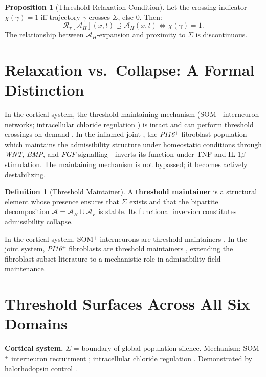 \documentclass[12pt, a4paper, twoside]{book}
\theoremstyle{definition}
\newtheorem{definition}{Definition}[chapter]
\newtheorem{proposition}{Proposition}[chapter]
\theoremstyle{remark}
\newcommand{\Adm}{\mathcal{A}}
\newcommand{\Relax}{\mathcal{R}}
\newcommand{\term}[1]{\textbf{#1}}
\newcommand{\gene}[1]{\textit{#1}}
\begin{document}
\begin{proposition}[Threshold Relaxation Condition]
Let the crossing indicator $\chi(\gamma) = 1$ iff trajectory $\gamma$ crosses $\Sigma$, else $0$. Then:
\begin{equation}
  \Relax_\tau[\Adm_H](x,t) \supsetneq \Adm_H(x,t) \iff \chi(\gamma) = 1.
\end{equation}
The relationship between $\Adm_H$-expansion and proximity to $\Sigma$ is discontinuous.
\end{proposition}

\section{Relaxation vs.\ Collapse: A Formal Distinction}

In the cortical system, the threshold-maintaining mechanism (SOM$^+$ interneuron networks; intracellular chloride regulation \citep{alfonsa2023, funk2017}) is intact and can perform threshold crossings on demand \citep{driessen2026}. In the inflamed joint \citep{davidson2026}, the \gene{PI16}$^+$ fibroblast population---which maintains the admissibility structure under homeostatic conditions through \gene{WNT}, \gene{BMP}, and \gene{FGF} signalling---inverts its function under TNF and IL-1$\beta$ stimulation. The maintaining mechanism is not bypassed; it becomes actively destabilizing.

\begin{definition}[Threshold Maintainer]
A \term{threshold maintainer} is a structural element whose presence ensures that $\Sigma$ exists and that the bipartite decomposition $\Adm = \Adm_H \cup \Adm_F$ is stable. Its functional inversion constitutes admissibility collapse.
\end{definition}

In the cortical system, SOM$^+$ interneurons are threshold maintainers \citep{funk2017}. In the joint system, \gene{PI16}$^+$ fibroblasts are threshold maintainers \citep{davidson2026}, extending the fibroblast-subset literature \citep{croft2019, zhang2019} to a mechanistic role in admissibility field maintenance.

\section{Threshold Surfaces Across All Six Domains}

\textbf{Cortical system.} $\Sigma$ = boundary of global population silence. Mechanism: SOM$^+$ interneuron recruitment \citep{funk2017}; intracellular chloride regulation \citep{alfonsa2023}. Demonstrated by halorhodopsin control \citep{driessen2026}.
\end{document}
